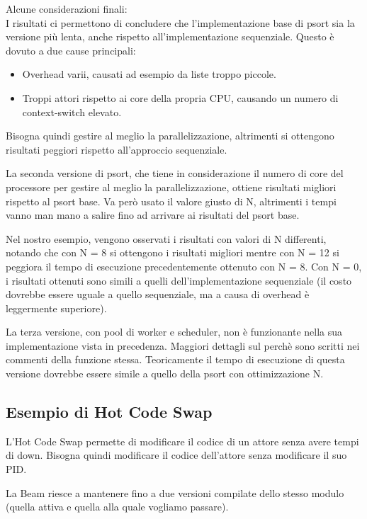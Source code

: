 \documentclass{article}
\begin{document}
Alcune considerazioni finali:\\
I risultati ci permettono di concludere che l'implementazione base di psort sia la versione più lenta, anche rispetto all'implementazione sequenziale. Questo è dovuto a due cause principali:
\begin{itemize}
    \item Overhead varii, causati ad esempio da liste troppo piccole.
    \item Troppi attori rispetto ai core della propria CPU, causando un numero di context-switch elevato.
\end{itemize}
Bisogna quindi gestire al meglio la parallelizzazione, altrimenti si ottengono risultati peggiori rispetto all'approccio sequenziale.

La seconda versione di psort, che tiene in considerazione il numero di core del processore per gestire al meglio la parallelizzazione, ottiene risultati migliori rispetto al psort base. Va però usato il valore giusto di N, altrimenti i tempi vanno man mano a salire fino ad arrivare ai risultati del psort base.

Nel nostro esempio, vengono osservati i risultati con valori di N differenti, notando che con N = 8 si ottengono i risultati migliori mentre con N = 12 si peggiora il tempo di esecuzione precedentemente ottenuto con N = 8. Con N = 0, i risultati ottenuti sono simili a quelli dell'implementazione sequenziale (il costo dovrebbe essere uguale a quello sequenziale, ma a causa di overhead è leggermente superiore).

La terza versione, con pool di worker e scheduler, non è funzionante nella sua implementazione vista in precedenza. Maggiori dettagli sul perchè sono scritti nei commenti della funzione stessa. Teoricamente il tempo di esecuzione di questa versione dovrebbe essere simile a quello della psort con ottimizzazione N.

\pagebreak

\subsection*{Esempio di Hot Code Swap}
L'Hot Code Swap permette di modificare il codice di un attore senza avere tempi di down. Bisogna quindi modificare il codice dell'attore senza modificare il suo PID.

La Beam riesce a mantenere fino a due versioni compilate dello stesso modulo (quella attiva e quella alla quale vogliamo passare).
\end{document}
